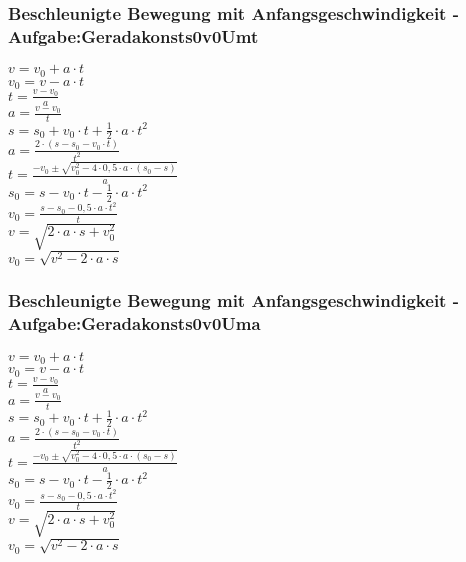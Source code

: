 \subsubsection{Beschleunigte Bewegung mit Anfangsgeschwindigkeit - Aufgabe:Geradakonsts0v0Umt} 
\begin{minipage}{0.45\textwidth} 
$ v = v_{0}  + a\cdot t $\\ 
$ v_{0}  = v - a\cdot t $\\ 
$ t = \frac{v - v_{0} }{a} $\\ 
$ a = \frac{v - v_{0} }{  t} $\\ 
$ s = s_{0}  + v_{0} \cdot t + \frac{1}{2}\cdot a\cdot t^{2} $\\ 
$ a = \frac{2\cdot (s - s_{0}  - v_{0} \cdot t)}{     t^{2} } $\\ 
$ t = \frac{-v_{0}  \pm \sqrt{v_{0} ^{2} -4\cdot 0,5\cdot a\cdot (s_{0}  -s)}}{       a} $\\ 
$ s_{0}  = s - v_{0} \cdot t - \frac{1}{2}\cdot a\cdot t^{2} $\\ 
$ v_{0}  =\frac{s-s_{0} -0,5\cdot a\cdot t^{2} }{    t} $\\ 
$ v  =\sqrt{2\cdot a \cdot s+ v_{0}^2} $\\ 
$ v_{0}  =\sqrt{v^2-2\cdot a \cdot s} $\\ 
\end{minipage} 
\begin{minipage}{0.45\textwidth} 
 
\end{minipage} 
\subsubsection{Beschleunigte Bewegung mit Anfangsgeschwindigkeit - Aufgabe:Geradakonsts0v0Uma} 
\begin{minipage}{0.45\textwidth} 
$ v = v_{0}  + a\cdot t $\\ 
$ v_{0}  = v - a\cdot t $\\ 
$ t = \frac{v - v_{0} }{a} $\\ 
$ a = \frac{v - v_{0} }{  t} $\\ 
$ s = s_{0}  + v_{0} \cdot t + \frac{1}{2}\cdot a\cdot t^{2} $\\ 
$ a = \frac{2\cdot (s - s_{0}  - v_{0} \cdot t)}{     t^{2} } $\\ 
$ t = \frac{-v_{0}  \pm \sqrt{v_{0} ^{2} -4\cdot 0,5\cdot a\cdot (s_{0}  -s)}}{       a} $\\ 
$ s_{0}  = s - v_{0} \cdot t - \frac{1}{2}\cdot a\cdot t^{2} $\\ 
$ v_{0}  =\frac{s-s_{0} -0,5\cdot a\cdot t^{2} }{    t} $\\ 
$ v  =\sqrt{2\cdot a \cdot s+ v_{0}^2} $\\ 
$ v_{0}  =\sqrt{v^2-2\cdot a \cdot s} $\\ 
\end{minipage} 
\begin{minipage}{0.45\textwidth} 
 
\end{minipage} 
